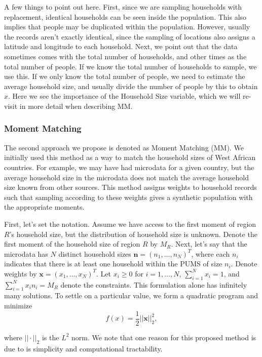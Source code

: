 \documentclass{article}
\begin{document}
		A few things to point out here. First, since we are sampling households with replacement, identical households can be seen inside the population. This also implies that people may be duplicated within the population. However, usually the records aren't exactly identical, since the sampling of locations also assigns a latitude and longitude to each household. Next, we point out that the data sometimes comes with the total number of households, and other times as the total number of people. If we know the total number of households to sample, we use this. If we only know the total number of people, we need to estimate the average household size, and usually divide the number of people by this to obtain $x$. Here we see the importance of the Household Size variable, which we will re-visit in more detail when describing MM.  


		\subsubsection{Moment Matching}
		The second approach we propose is denoted as Moment Matching (MM). We initially used this method as a way to match the household sizes of West African countries. For example, we may have had microdata for a given country, but the average household size in the microdata does not match the average household size known from other sources. This method assigns weights to household records such that sampling according to these weights gives a synthetic population with the appropriate moments.  


		First, let's set the notation. Assume we have access to the first moment of region $R$'s household size, but the distribution of household size is unknown. Denote the first moment of the household size of region $R$  by $M_R$. Next, let's say that the microdata has $N$ distinct household sizes $\textbf{n}=(n_1, \dots, n_N)^T$, where each $n_i$ indicates that there is at least one household within the PUMS of size $n_i$. Denote weights by $\textbf{x}=(x_1, \dots, x_N)^T. $ Let $x_i \ge 0$ for $i= 1, \dots, N$, $\sum_{i=1}^N x_i =1$, and $\sum_{i=1}^N x_in_i=M_R$ denote the constraints.  This formulation alone has infinitely many solutions.  To settle on a particular value, we form a quadratic program and minimize  $$f(x) =\frac{1}{2} ||\textbf{x}||_2^2,$$ 

		where $||\cdot||_2$ is the $L^2$ norm. We note that one reason for this proposed method is due to is simplicity and computational tractability. 
\end{document}

